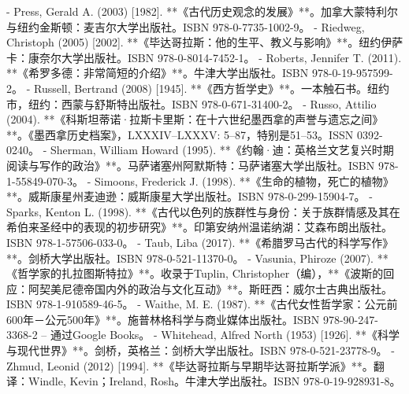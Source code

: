 - Press, Gerald A. (2003) [1982]. **《古代历史观念的发展》**。加拿大蒙特利尔与纽约金斯顿：麦吉尔大学出版社。ISBN 978-0-7735-1002-9。  
- Riedweg, Christoph (2005) [2002]. **《毕达哥拉斯：他的生平、教义与影响》**。纽约伊萨卡：康奈尔大学出版社。ISBN 978-0-8014-7452-1。  
- Roberts, Jennifer T. (2011). **《希罗多德：非常简短的介绍》**。牛津大学出版社。ISBN 978-0-19-957599-2。  
- Russell, Bertrand (2008) [1945]. **《西方哲学史》**。一本触石书。纽约市，纽约：西蒙与舒斯特出版社。ISBN 978-0-671-31400-2。  
- Russo, Attilio (2004). **《科斯坦蒂诺·拉斯卡里斯：在十六世纪墨西拿的声誉与遗忘之间》**。《墨西拿历史档案》，LXXXIV–LXXXV: 5–87，特别是51–53。ISSN 0392-0240。  
- Sherman, William Howard (1995). **《约翰·迪：英格兰文艺复兴时期阅读与写作的政治》**。马萨诸塞州阿默斯特：马萨诸塞大学出版社。ISBN 978-1-55849-070-3。  
- Simoons, Frederick J. (1998). **《生命的植物，死亡的植物》**。威斯康星州麦迪逊：威斯康星大学出版社。ISBN 978-0-299-15904-7。  
- Sparks, Kenton L. (1998). **《古代以色列的族群性与身份：关于族群情感及其在希伯来圣经中的表现的初步研究》**。印第安纳州温诺纳湖：艾森布朗出版社。ISBN 978-1-57506-033-0。  
- Taub, Liba (2017). **《希腊罗马古代的科学写作》**。剑桥大学出版社。ISBN 978-0-521-11370-0。  
- Vasunia, Phiroze (2007). **《哲学家的扎拉图斯特拉》**。收录于Tuplin, Christopher（编），**《波斯的回应：阿契美尼德帝国内外的政治与文化互动》**。斯旺西：威尔士古典出版社。ISBN 978-1-910589-46-5。  
- Waithe, M. E. (1987). **《古代女性哲学家：公元前600年－公元500年》**。施普林格科学与商业媒体出版社。ISBN 978-90-247-3368-2 – 通过Google Books。  
- Whitehead, Alfred North (1953) [1926]. **《科学与现代世界》**。剑桥，英格兰：剑桥大学出版社。ISBN 978-0-521-23778-9。  
- Zhmud, Leonid (2012) [1994]. **《毕达哥拉斯与早期毕达哥拉斯学派》**。翻译：Windle, Kevin；Ireland, Rosh。牛津大学出版社。ISBN 978-0-19-928931-8。



































